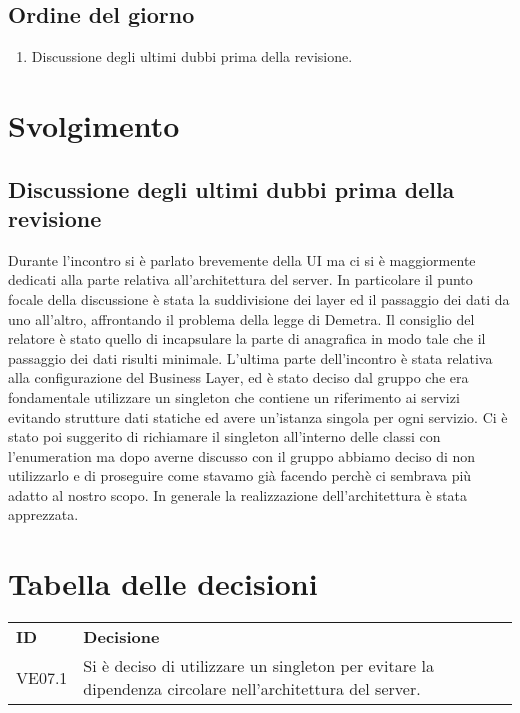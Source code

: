 \documentclass[]{article}
\begin{document}
	\subsection{Ordine del giorno}
	\begin{enumerate}
		\item Discussione degli ultimi dubbi prima della revisione.
	\end{enumerate}
	\newpage
	\section{Svolgimento}


	\subsection{Discussione degli ultimi dubbi prima della revisione}
	Durante l'incontro si è parlato brevemente della UI ma ci si è maggiormente dedicati alla parte relativa all'architettura del server. 
	In particolare il punto focale della discussione è stata la suddivisione dei layer ed il passaggio dei dati da uno all'altro, affrontando il problema della legge di Demetra.
	Il consiglio del relatore è stato quello di incapsulare la parte di anagrafica in modo tale che il passaggio dei dati risulti minimale.
	L'ultima parte dell'incontro è stata relativa alla configurazione del Business Layer, ed è stato deciso dal gruppo che era fondamentale utilizzare un singleton che contiene un riferimento ai servizi evitando strutture dati statiche ed avere un'istanza singola per ogni servizio.
	Ci è stato poi suggerito di richiamare il singleton all'interno delle classi con l'enumeration ma dopo averne discusso con il gruppo abbiamo deciso di non utilizzarlo e di proseguire come stavamo già facendo perchè ci sembrava più adatto al nostro scopo.
	In generale la realizzazione dell'architettura è stata apprezzata.

	\newpage

	\section{Tabella delle decisioni}

	\begin{table} [h!]
		\begin{center}
			\begin{tabular} { m{2cm} m{14cm} }
				\rowcolor{lightgray}
				\textbf{ID} & \textbf{Decisione}\\
				VE07.1 & Si è deciso di utilizzare un singleton per evitare la dipendenza circolare nell'architettura del server.
			\end{tabular}
		\end{center}
	\end{table}
\end{document}
